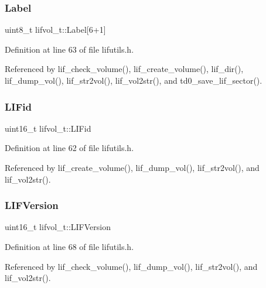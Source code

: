 \subsubsection{\texorpdfstring{Label}{Label}}
{\footnotesize\ttfamily uint8\+\_\+t lifvol\+\_\+t\+::\+Label\mbox{[}6+1\mbox{]}}



Definition at line 63 of file lifutils.\+h.



Referenced by lif\+\_\+check\+\_\+volume(), lif\+\_\+create\+\_\+volume(), lif\+\_\+dir(), lif\+\_\+dump\+\_\+vol(), lif\+\_\+str2vol(), lif\+\_\+vol2str(), and td0\+\_\+save\+\_\+lif\+\_\+sector().

\mbox{\label{structlifvol__t_adb6a0c2fff5b765eb12c3eb5db6d5bad}} 
\subsubsection{\texorpdfstring{L\+I\+Fid}{LIFid}}
{\footnotesize\ttfamily uint16\+\_\+t lifvol\+\_\+t\+::\+L\+I\+Fid}



Definition at line 62 of file lifutils.\+h.



Referenced by lif\+\_\+create\+\_\+volume(), lif\+\_\+dump\+\_\+vol(), lif\+\_\+str2vol(), and lif\+\_\+vol2str().

\mbox{\label{structlifvol__t_afffd824a7b0ce6aa8410fa243733475f}} 
\subsubsection{\texorpdfstring{L\+I\+F\+Version}{LIFVersion}}
{\footnotesize\ttfamily uint16\+\_\+t lifvol\+\_\+t\+::\+L\+I\+F\+Version}



Definition at line 68 of file lifutils.\+h.



Referenced by lif\+\_\+check\+\_\+volume(), lif\+\_\+dump\+\_\+vol(), lif\+\_\+str2vol(), and lif\+\_\+vol2str().

\mbox{\label{structlifvol__t_ad245f7419e180934262f53acd9b4349c}} 

